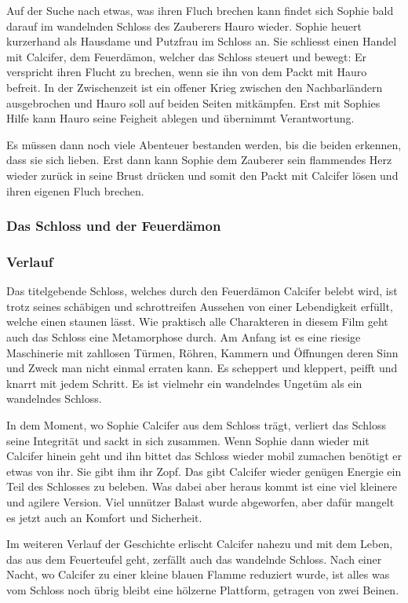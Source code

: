 Auf der Suche nach etwas, was ihren Fluch brechen kann findet sich Sophie bald darauf im wandelnden Schloss des Zauberers Hauro wieder. Sophie heuert kurzerhand als Hausdame und Putzfrau im Schloss an. Sie schliesst einen Handel mit Calcifer, dem Feuerdämon, welcher das Schloss steuert und bewegt: Er verspricht ihren Flucht zu brechen, wenn sie ihn von dem Packt mit Hauro befreit. In der Zwischenzeit ist ein offener Krieg zwischen den Nachbarländern ausgebrochen und Hauro soll auf beiden Seiten mitkämpfen. Erst mit Sophies Hilfe kann Hauro seine Feigheit ablegen und übernimmt Verantwortung. 

Es müssen dann noch viele Abenteuer bestanden werden, bis die beiden erkennen, dass sie sich lieben. Erst dann kann Sophie dem Zauberer sein flammendes Herz wieder zurück in seine Brust drücken und somit den Packt mit Calcifer lösen und ihren eigenen Fluch brechen. 

\subsubsection{Das Schloss und der Feuerdämon}
\subsubsection*{Verlauf}
Das titelgebende Schloss, welches durch den Feuerdämon Calcifer belebt wird, ist trotz seines schäbigen und schrottreifen Aussehen von einer Lebendigkeit erfüllt, welche einen staunen lässt. Wie praktisch alle Charakteren in diesem Film geht auch das Schloss eine Metamorphose durch. Am Anfang ist es eine riesige Maschinerie mit zahllosen Türmen, Röhren, Kammern und Öffnungen deren Sinn und Zweck man nicht einmal erraten kann. Es scheppert und kleppert, peifft und knarrt mit jedem Schritt. Es ist vielmehr ein wandelndes Ungetüm als ein wandelndes Schloss.

In dem Moment, wo Sophie Calcifer aus dem Schloss trägt, verliert das Schloss seine Integrität und sackt in sich zusammen. Wenn Sophie dann wieder mit Calcifer hinein geht und ihn bittet das Schloss wieder mobil zumachen benötigt er etwas von ihr. Sie gibt ihm ihr Zopf. Das gibt Calcifer wieder genügen Energie ein Teil des Schlosses zu beleben. Was dabei aber heraus kommt ist eine viel kleinere und agilere Version. Viel unnützer Balast wurde abgeworfen, aber dafür mangelt es jetzt auch an Komfort und Sicherheit. 

Im weiteren Verlauf der Geschichte erlischt Calcifer nahezu und mit dem Leben, das aus dem Feuerteufel geht, zerfällt auch das wandelnde Schloss. Nach einer Nacht, wo Calcifer zu einer kleine blauen Flamme reduziert wurde, ist alles was vom Schloss noch übrig bleibt eine hölzerne Plattform, getragen von zwei Beinen. 


